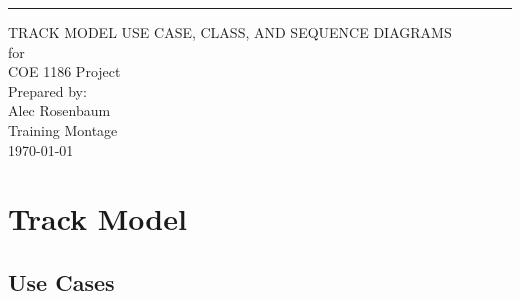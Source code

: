 \documentclass{scrreprt}
\begin{document}
\begin{flushright}
    \rule{16cm}{5pt}\vskip1cm
    \begin{bfseries}
        \Huge{TRACK MODEL USE CASE, CLASS, AND SEQUENCE DIAGRAMS}\\
        \vspace{.9cm}
        for\\
        \vspace{.9cm}
        COE 1186 Project\\
        \vspace{.9cm}
        \vspace{.9cm}
        Prepared by:\\
        Alec Rosenbaum\\
        \vspace{4.9cm}
        Training Montage\\
        \vspace{.9cm}
        \today\\
    \end{bfseries}
\end{flushright}

\tableofcontents

\chapter{Track Model}

\section{Use Cases}
\end{document}
